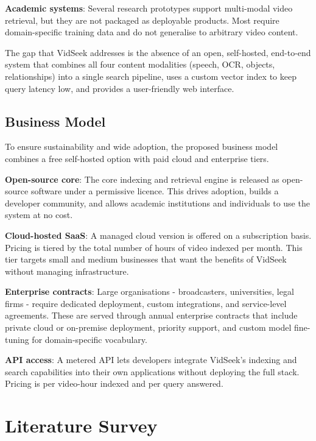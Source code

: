 \documentclass[12pt, a4paper]{report}
\begin{document}
\textbf{Academic systems}: Several research prototypes support multi-modal
video retrieval, but they are not packaged as deployable products. Most
require domain-specific training data and do not generalise to arbitrary
video content.

The gap that VidSeek addresses is the absence of an open, self-hosted,
end-to-end system that combines all four content modalities (speech, OCR,
objects, relationships) into a single search pipeline, uses a custom vector
index to keep query latency low, and provides a user-friendly web interface.

\section{Business Model}

To ensure sustainability and wide adoption, the proposed business model
combines a free self-hosted option with paid cloud and enterprise tiers.

\textbf{Open-source core}: The core indexing and retrieval engine is released
as open-source software under a permissive licence. This drives adoption,
builds a developer community, and allows academic institutions and individuals
to use the system at no cost.

\textbf{Cloud-hosted SaaS}: A managed cloud version is offered on a
subscription basis. Pricing is tiered by the total number of hours of video
indexed per month. This tier targets small and medium businesses that
want the benefits of VidSeek without managing infrastructure.

\textbf{Enterprise contracts}: Large organisations - broadcasters, universities,
legal firms - require dedicated deployment, custom integrations, and
service-level agreements. These are served through annual enterprise contracts
that include private cloud or on-premise deployment, priority support, and
custom model fine-tuning for domain-specific vocabulary.

\textbf{API access}: A metered API lets developers integrate VidSeek's indexing
and search capabilities into their own applications without deploying the
full stack. Pricing is per video-hour indexed and per query answered.


\chapter{Literature Survey}
\end{document}
